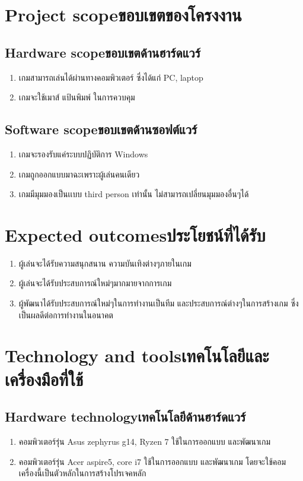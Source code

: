 \section{\ifenglish Project scope\else ขอบเขตของโครงงาน\fi}

\subsection{\ifenglish Hardware scope\else ขอบเขตด้านฮาร์ดแวร์\fi}
\begin{enumerate}
    \item เกมสามารถเล่นได้ผ่านทางคอมพิวเตอร์ ซึ่งได้แก่ PC, laptop
    \item เกมจะใช้เมาส์ แป้นพิมพ์ ในการควบคุม
\end{enumerate}
\subsection{\ifenglish Software scope\else ขอบเขตด้านซอฟต์แวร์\fi}
\begin{enumerate}
    \item เกมจะรองรับแค่ระบบปฏิบัติการ Windows
    \item เกมถูกออกแบบมาฉะเพราะผู้เล่นคนเดียว
    \item เกมมีมุมมองเป็นเเบบ third person เท่านั้น ไม่สามารถเปลี่ยนมุมมองอื่นๆได้
\end{enumerate}
\section{\ifenglish Expected outcomes\else ประโยชน์ที่ได้รับ\fi}
\begin{enumerate}
    \item ผู้เล่นจะได้รับความสนุกสนาน ความบันเทิงต่างๆภายในเกม
    \item ผู้เล่นจะได้รับประสบการณ์ใหม่ๆมากมายจากการเกม
    \item ผู้พัฒนาได้รับประสบการณ์ใหม่ๆในการทำงานเป็นทีม และประสบการณ์ต่างๆในการสร้างเกม ซึ่งเป็นผลดีต่อการทำงานในอนาคต
\end{enumerate}
\section{\ifenglish Technology and tools\else เทคโนโลยีและเครื่องมือที่ใช้\fi}

\subsection{\ifenglish Hardware technology\else เทคโนโลยีด้านฮาร์ดแวร์\fi}
\begin{enumerate}
    \item คอมพิวเตอร์รุ่น Asus zephyrus g14, Ryzen 7 ใช้ในการออกแบบ และพัฒนาเกม
    \item คอมพิวเตอร์รุ่น Acer aspire5, core i7 ใช้ในการออกแบบ และพัฒนาเกม โดยจะใช้คอมเครื่องนี้เป็นตัวหลักในการสร้างโปรเจคหลัก
\end{enumerate}
